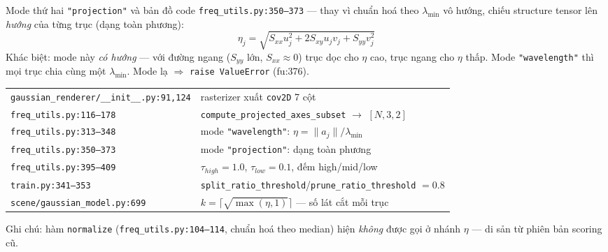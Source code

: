 \begin{frame}{Mode thứ hai \texttt{"projection"} và bản đồ code}
\scriptsize
\texttt{freq\_utils.py:350--373} --- thay vì chuẩn hoá theo $\lambda_{\min}$ vô hướng, chiếu
structure tensor lên \emph{hướng} của từng trục (dạng toàn phương):
\[
\eta_j=\sqrt{S_{xx}u_j^2+2S_{xy}u_jv_j+S_{yy}v_j^2}
\]
Khác biệt: mode này \emph{có hướng} --- với đường ngang ($S_{yy}$ lớn, $S_{xx}\approx 0$) trục dọc cho $\eta$ cao,
trục ngang cho $\eta$ thấp. Mode \texttt{"wavelength"} thì mọi trục chia cùng một $\lambda_{\min}$.
Mode lạ $\Rightarrow$ \texttt{raise ValueError} (fu:376).
\vspace{1mm}

\begin{center}\scriptsize
\begin{tabular}{ll}
\hline
\texttt{gaussian\_renderer/\_\_init\_\_.py:91,124} & rasterizer xuất \texttt{cov2D} 7 cột\\
\texttt{freq\_utils.py:116--178} & \texttt{compute\_projected\_axes\_subset} $\to$ $[N,3,2]$\\
\texttt{freq\_utils.py:313--348} & mode \texttt{"wavelength"}: $\eta=\|a_j\|/\lambda_{\min}$\\
\texttt{freq\_utils.py:350--373} & mode \texttt{"projection"}: dạng toàn phương\\
\texttt{freq\_utils.py:395--409} & $\tau_{high}=1.0$, $\tau_{low}=0.1$, đếm high/mid/low\\
\texttt{train.py:341--353} & \texttt{split\_ratio\_threshold}/\texttt{prune\_ratio\_threshold} $=0.8$\\
\texttt{scene/gaussian\_model.py:699} & $k=\lceil\sqrt{\max(\eta,1)}\rceil$ --- số lát cắt mỗi trục\\
\hline
\end{tabular}
\end{center}
\vspace{1mm}
Ghi chú: hàm \texttt{normalize} (\texttt{freq\_utils.py:104--114}, chuẩn hoá theo median) hiện \emph{không}
được gọi ở nhánh $\eta$ --- di sản từ phiên bản scoring cũ.
\end{frame}
